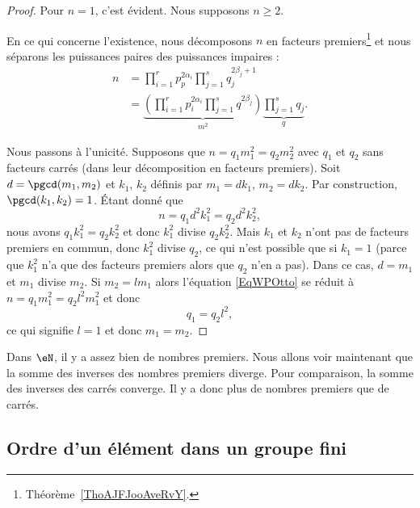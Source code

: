 \begin{proof}
    Pour \( n=1\), c'est évident. Nous supposons \( n\geq 2\).

    En ce qui concerne l'existence, nous décomposons \( n\) en facteurs premiers\footnote{Théorème~\ref{ThoAJFJooAveRvY}.} et nous séparons les puissances paires des puissances impaires :
    \begin{subequations}
        \begin{align}
            n&=\prod_{i=1}^rp_p^{2\alpha_i}\prod_{j=1}^sq_{j}^{2\beta_j+1}\\
            &=\underbrace{\left( \prod_{i=1}^rp_i^{2\alpha_i}\prod_{j=1}^sq^{2\beta_j} \right)}_{m^2}\underbrace{\prod_{j=1}^sq_j}_{q}.
        \end{align}
    \end{subequations}

    Nous passons à l'unicité. Supposons que \( n=q_1m_1^2=q_2m_2^2\) avec \( q_1\) et \( q_2\) sans facteurs carrés (dans leur décomposition en facteurs premiers). Soit \( d=\pgcd(m_1,m_2)\) et \( k_1\), \( k_2\) définis par \( m_1=dk_1\), \( m_2=dk_2\). Par construction, \( \pgcd(k_1,k_2)=1\). Étant donné que
    \begin{equation}        \label{EqWPOtto}
        n=q_1d^2k_1^2=q_2d^2k_2^2,
    \end{equation}
    nous avons \( q_1k_1^2=q_2k_2^2\) et donc \( k_1^2\) divise \( q_2k_2^2\). Mais \( k_1\) et \( k_2\) n'ont pas de facteurs premiers en commun, donc \( k_1^2\) divise \( q_2\), ce qui n'est possible que si \( k_1=1\) (parce que \( k_1^2\) n'a que des facteurs premiers alors que \( q_2\) n'en a pas). Dans ce cas, \( d=m_1\) et \( m_1\) divise \( m_2\). Si \( m_2=lm_1\) alors l'équation \eqref{EqWPOtto} se réduit à  \( n=q_1m_1^2=q_2l^2m_1^2\) et donc
    \begin{equation}
        q_1=q_2l^2,
    \end{equation}
    ce qui signifie \( l=1\) et donc \( m_1=m_2\).
\end{proof}

Dans \( \eN\), il y a assez bien de nombres premiers. Nous allons voir maintenant que la somme des inverses des nombres premiers diverge. Pour comparaison, la somme des inverses des carrés converge. Il y a donc plus de nombres premiers que de carrés.

\subsection{Ordre d'un élément dans un groupe fini}

